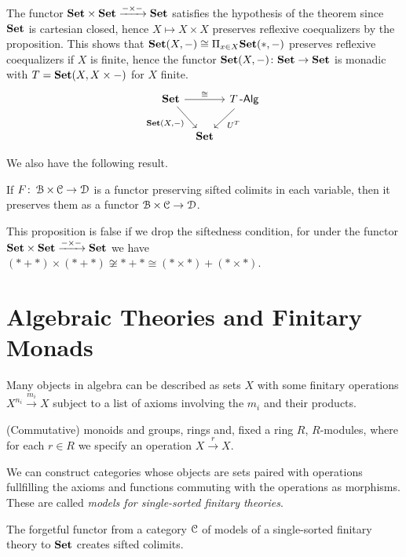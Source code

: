 \documentclass[a4paper,11pt,oneside,openany]{scrbook}
\begin{document}
\begin{exmp}
	The functor ${\normalfont\textbf{Set}}\times{\normalfont\textbf{Set}}\xrightarrow{-\times-}{\normalfont\textbf{Set}}$ satisfies the hypothesis of the theorem since ${\normalfont\textbf{Set}}$ is cartesian closed, hence $X\mapsto X\times X$ preserves reflexive coequalizers by the proposition. This shows that ${\normalfont\textbf{Set}}(X,-)\cong\Pi_{x\in X}{\normalfont\textbf{Set}}(*,-)$ preserves reflexive coequalizers if $X$ is finite, hence the functor ${\normalfont\textbf{Set}}(X,-)\colon{\normalfont\textbf{Set}}\rightarrow{\normalfont\textbf{Set}}$ is monadic with $T={\normalfont\textbf{Set}}(X,X\times-)$ for $X$ finite.
	\[
		\begin{tikzcd}[column sep=tiny]
			\Set\ar[rr, "\cong"] \ar[dr, swap, "{\Set(X,-)}"]
			&& T\Alg\ar[dl, "U^T"] \\
			& \Set
		\end{tikzcd}
	\]
\end{exmp}

We also have the following result.

\begin{prop}
	If $F\colon\operatorname{\mathcal{B}}\times\operatorname{\mathcal{C}}\rightarrow\operatorname{\mathcal{D}}$ is a functor preserving sifted colimits in each variable, then it preserves them as a functor $\operatorname{\mathcal{B}}\times\operatorname{\mathcal{C}}\rightarrow\operatorname{\mathcal{D}}$.
\end{prop}

\begin{rmk}
	This proposition is false if we drop the siftedness condition, for under the functor ${\normalfont\textbf{Set}}\times{\normalfont\textbf{Set}}\xrightarrow{-\times-}{\normalfont\textbf{Set}}$ we have $(*+*)\times (*+*)\not\cong *+*\cong (*\times*)+(*\times *)$.
\end{rmk}

\section{Algebraic Theories and Finitary Monads}

Many objects in algebra can be described as sets $X$ with some finitary operations $X^{n_i}\xrightarrow{m_i}X$ subject to a list of axioms involving the $m_i$ and their products.

\begin{exmp}
	(Commutative) monoids and groups, rings and, fixed a ring $R$, $R$-modules, where for each $r\in R$ we specify an operation $X\xrightarrow{r}X$.
\end{exmp}

We can construct categories whose objects are sets paired with operations
fullfilling the axioms and functions commuting with the operations as morphisms.
These are called \emph{models for single-sorted finitary theories}.

\begin{prop}
	The forgetful functor from a category $\operatorname{\mathcal{C}}$ of models of a single-sorted finitary theory to ${\normalfont\textbf{Set}}$ creates sifted colimits.
\end{prop}
\end{document}
